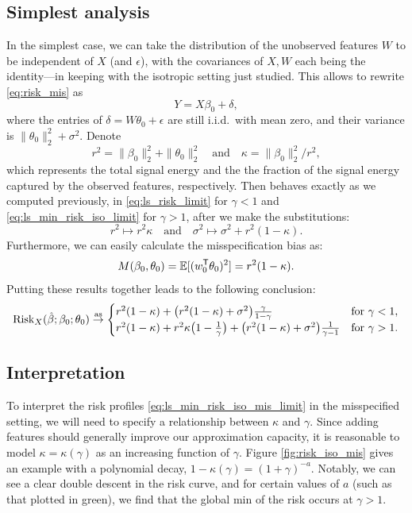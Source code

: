 \documentclass{article}
\begin{document}
\subsection{Simplest analysis}

In the simplest case, we can take the distribution of the unobserved features
$W$ to be independent of $X$ (and $\epsilon$), with the covariances of $X,W$
each being the identity---in keeping with the isotropic setting just
studied. This allows to rewrite \eqref{eq:risk_mis} as 
\[
Y = X\beta_0 + \delta,
\]
where the entries of $\delta = W\theta_0 + \epsilon$ are still i.i.d.\ with mean
zero, and their variance is $\|\theta_0\|_2^2 + \sigma^2$. Denote 
\[
r^2=\|\beta_0\|_2^2+\|\theta_0\|_2^2 \quad \text{and} \quad 
\kappa=\|\beta_0\|_2^2 / r^2,
\]
which represents the total signal energy and the the fraction of the signal
energy captured by the observed features, respectively. Then  behaves exactly as we computed previously, in
\eqref{eq:ls_risk_limit} for $\gamma<1$ and \eqref{eq:ls_min_risk_iso_limit} for
$\gamma>1$, after we make the substitutions:     
\[
r^2 \mapsto r^2 \kappa \quad \text{and} \quad
\sigma^2 \mapsto \sigma^2 + r^2 (1-\kappa).
\]
Furthermore, we can easily calculate the misspecification bias as: 
\[
M(\beta_0, \theta_0) = \mathbb{E}[(w_0^{\mathsf{T}} \theta_0)^2] = r^2 (1-\kappa). 
\]
Putting these results together leads to the following conclusion:
\begin{equation}
\label{eq:ls_min_risk_iso_mis_limit}
\mathrm{Risk}_X(\hat{\beta}; \beta_0; \theta_0) \overset{\mathrm{as}}{\to} 
\begin{cases}
r^2(1-\kappa) + \big(r^2(1-\kappa) + \sigma^2\big) 
\frac{\gamma}{1-\gamma} & \text{for $\gamma < 1$}, \\
r^2(1-\kappa) + r^2 \kappa \big(1-\frac{1}{\gamma}\big) 
+ \big(r^2(1-\kappa) + \sigma^2\big) \frac{1}{\gamma-1} &  
\text{for $\gamma > 1$}.
\end{cases}
\end{equation}

\subsection{Interpretation}

To interpret the risk profiles \eqref{eq:ls_min_risk_iso_mis_limit} in the
misspecified setting, we will need to specify a relationship between $\kappa$
and $\gamma$. Since adding features should generally improve our approximation
capacity, it is reasonable to model $\kappa=\kappa(\gamma)$ as an increasing 
function of $\gamma$. Figure \ref{fig:risk_iso_mis} gives an example with a
polynomial decay, $1-\kappa(\gamma) = (1+\gamma)^{-a}$. Notably, we can see a
clear double descent in the risk curve, and for certain values of $a$ (such as
that plotted in green), we find that the global min of the risk occurs at
$\gamma > 1$.  
\end{document}
